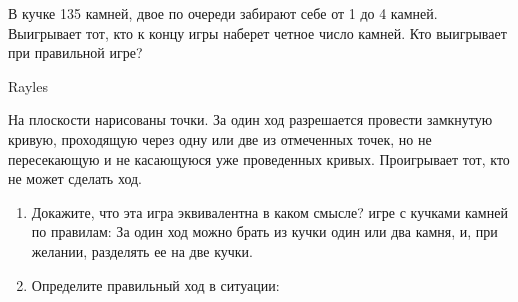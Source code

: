 \begin{problem}
В кучке 135 камней, двое по очереди забирают себе от 1 до 4 камней. Выигрывает тот, кто к концу игры наберет четное число камней. Кто выигрывает при правильной игре?\par

\begin{sol}
\end{sol}
\end{problem}













\begin{problem}
\begin{source} Rayles\end{source}
 \label{Rayles}
На плоскости нарисованы точки. За один ход разрешается провести замкнутую кривую, проходящую через одну или две из отмеченных точек, но не пересекающую и не касающуюся уже проведенных кривых. Проигрывает тот, кто не может сделать ход.\par
\begin{enumerate}
\item 	Докажите, что эта игра эквивалентна {\red в каком смысле?} игре с кучками камней по правилам: За один ход можно брать из кучки один или два камня, и, при желании, разделять ее на две кучки.\par
\item 	Определите правильный ход в ситуации:\par
\end{enumerate}


\begin{sol}

\end{sol}
\end{problem}

